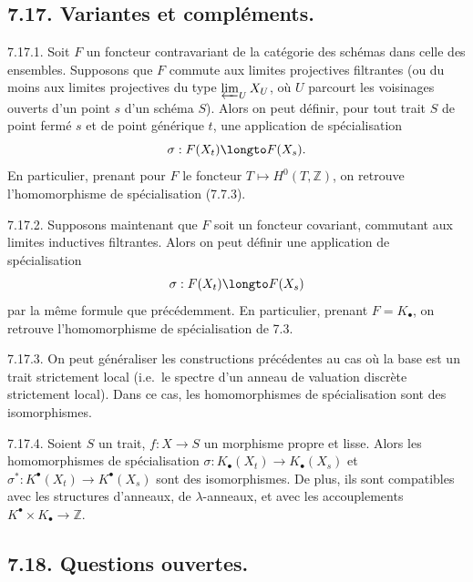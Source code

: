 \subsection*{7.17. Variantes et compl\'ements.}

7.17.1. Soit $F$ un foncteur contravariant de la cat\'egorie des sch\'emas dans celle des ensembles. Supposons que $F$ commute aux limites projectives filtrantes (ou du moins aux limites projectives du type $\varprojlim_{U} X_{U}$, o\`u $U$ parcourt les voisinages ouverts d'un point $s$ d'un sch\'ema $S$). Alors on peut d\'efinir, pour tout trait $S$ de point ferm\'e $s$ et de point g\'en\'erique $t$, une application de sp\'ecialisation
\begin{equation}\label{eq:7.17.2}
\sigma : F(X_{t}) \longto F(X_{s}).
\end{equation}
En particulier, prenant pour $F$ le foncteur $T \mapsto H^{0}(T, \mathbb{Z})$, on retrouve l'homomorphisme de sp\'ecialisation (7.7.3).

7.17.2. Supposons maintenant que $F$ soit un foncteur covariant, commutant aux limites inductives filtrantes. Alors on peut d\'efinir une application de sp\'ecialisation
\begin{equation}\label{eq:7.17.3}
\sigma : F(X_{t}) \longto F(X_{s})
\end{equation}
par la m\^eme formule que pr\'ec\'edemment. En particulier, prenant $F = K_{\bullet}$, on retrouve l'homomorphisme de sp\'ecialisation de 7.3.

7.17.3. On peut g\'en\'eraliser les constructions pr\'ec\'edentes au cas o\`u la base est un trait strictement local (i.e.\ le spectre d'un anneau de valuation discr\`ete strictement local). Dans ce cas, les homomorphismes de sp\'ecialisation sont des isomorphismes.

7.17.4. Soient $S$ un trait, $f : X \to S$ un morphisme propre et lisse. Alors les homomorphismes de sp\'ecialisation $\sigma : K_{\bullet}(X_{t}) \to K_{\bullet}(X_{s})$ et $\sigma^{*} : K^{\bullet}(X_{t}) \to K^{\bullet}(X_{s})$ sont des isomorphismes. De plus, ils sont compatibles avec les structures d'anneaux, de $\lambda$-anneaux, et avec les accouplements $K^{\bullet} \times K_{\bullet} \to \mathbb{Z}$.

\subsection*{7.18. Questions ouvertes.}

